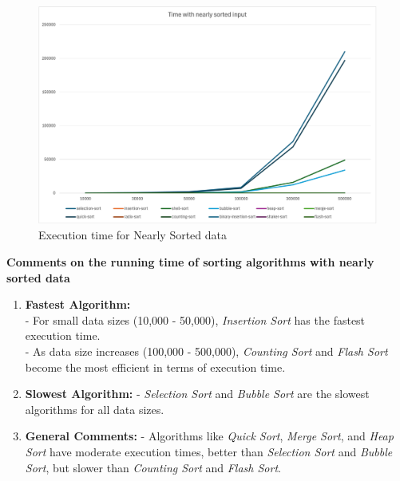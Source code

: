 \begin{figure}[h]
    \centering
    \includegraphics[scale=.65]{Figures/Visualization/Nearly_time.png}
    \caption{Execution time for Nearly Sorted data}
    \label{fig:enter-label}
\end{figure}

\textbf{Comments on the running time of sorting algorithms with nearly sorted data}

\begin{enumerate}
    \item \textbf{Fastest Algorithm:} \\
  - For small data sizes (10,000 - 50,000), \textit{Insertion Sort} has the fastest execution time. \\
  - As data size increases (100,000 - 500,000), \textit{Counting Sort} and \textit{Flash Sort} become the most efficient in terms of execution time.

    \item \textbf{Slowest Algorithm:}
  - \textit{Selection Sort} and \textit{Bubble Sort} are the slowest algorithms for all data sizes.

    \item \textbf{General Comments:}
  - Algorithms like \textit{Quick Sort}, \textit{Merge Sort}, and \textit{Heap Sort} have moderate execution times, better than \textit{Selection Sort} and \textit{Bubble Sort}, but slower than \textit{Counting Sort} and \textit{Flash Sort}.
\end{enumerate}


